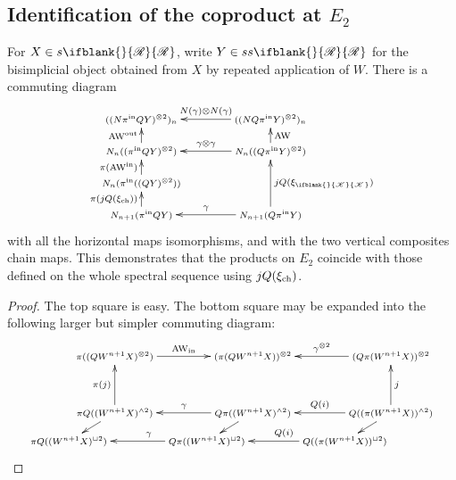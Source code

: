 \documentclass[10pt]{article}
\newcommand{\PRLie}[1]%
{\ifblank{#1}{\scrR}{\scrR^{#1}}}
\newcommand{\LL}[1]{\ifblank{#1}{\scrK}{\scrK^{#1}}}
\begin{document}
\begin{Grothendieck Multiplicativity}
\subsection{Identification of the coproduct at $E_2$}
\begin{thm}
For $X\in s\PRLie{}$, write $Y\in ss\PRLie{}$ for the bisimplicial object obtained from $X$ by repeated application of $W$. There is a commuting diagram
\[\xymatrix@C=13mm@R=4mm{
((N\pi^{\textup{in}}QY)^{\otimes2})_n&%
((NQ\pi^{\textup{in}}Y)^{\otimes2})_{n}
\ar[l]_-{N(\gamma)\otimes N(\gamma)}
\\%
N_n((\pi^{\textup{in}}QY)^{\otimes2})
\ar[u]^-{\textup{AW}^\textup{out}}
&%
N_n((Q\pi^{\textup{in}}Y)^{\otimes2})
\ar[u]_-{\textup{AW}}
\ar[l]_-{\gamma\otimes\gamma}
\\%
N_n(\pi^\textup{in}((QY)^{\otimes2}))
\ar[u]^-{\pi(\textup{AW}^\textup{in})}
&%
\\%
N_{n+1}(\pi^\textup{in} QY)
\ar[u]^-{\pi(j\circ Q(\xi_\textup{ch}))}
&%
N_{n+1}(Q\pi^\textup{in} Y)
\ar[uu]_-{j\circ Q(\xi_{\LL{}})}
\ar[l]_-{\gamma}
}\]
with all the horizontal maps isomorphisms, and with the two vertical composites chain maps. This demonstrates that the products on $E_2$ coincide with those defined on the whole spectral sequence using $j\circ Q(\xi_\textup{ch})$.
\end{thm}
\begin{proof}
The top square is easy. The bottom square may be expanded into the following larger but simpler commuting diagram:
\[
\def\objectstyle{\scriptstyle}
\xymatrix@R=8mm@C=13mm@!0{
&%
\pi((QW^{n+1}X)^{\otimes2})\ar[rrr]^-{\textup{AW}_{\textup{in}}}
&%
&%
&%
(\pi (QW^{n+1}X))^{\otimes2}&%
&%
&%
(Q\pi(W^{n+1}X))^{\otimes2}\ar[lll]_-{\gamma^{\otimes2}}\\\\%
&%
\pi Q((W^{n+1}X)^{\wedge 2})\ar[uu]^-{\pi(j)}
\ar[dl]
&%
&%
&%
Q\pi((W^{n+1}X)^{\wedge 2})\ar[lll]_-{\gamma}\ar[dl]
&%
&%
&%
Q((\pi( W^{n+1}X))^{\wedge 2})\ar[dl]
\ar[uu]_-{j}
\ar[lll]_-{Q(i)}
\\
\pi Q((W^{n+1}X)^{\sqcup 2})
&%
&%
&%
Q\pi((W^{n+1}X)^{\sqcup 2})\ar[lll]_-(.3){\gamma}
&%
&%
&%
Q((\pi( W^{n+1}X))^{\sqcup 2})
\ar[lll]_-(.3){Q(i)}
}\]
\end{proof}
\end{Grothendieck Multiplicativity}
\end{document}
